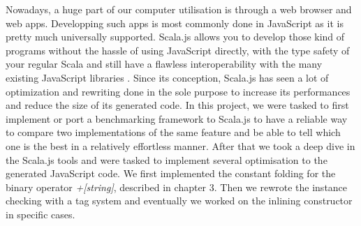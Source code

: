 Nowadays, a huge part of our computer utilisation is through a web browser and
web apps.
Developping such apps is most commonly done in JavaScript as it is pretty much
universally supported. Scala.js allows you to develop those kind of programs
without the hassle of using JavaScript directly, with the type safety of your
regular Scala and still have a flawless interoperability with the many existing
JavaScript libraries \cite{scalajsInterop}.
Since its conception, Scala.js has seen a lot of optimization and rewriting
done in the sole purpose to increase its performances and reduce the size of
its generated code.
In this project, we were tasked to first implement or port a benchmarking
framework to Scala.js to have a reliable way to compare two implementations of
the same feature and be able to tell which one is the best in a relatively
effortless manner.
After that we took a deep dive in the Scala.js tools and were tasked to
implement several optimisation to the generated JavaScript code. We first
implemented the constant folding for the binary operator \emph{+[string]},
described in chapter 3. Then we rewrote the instance checking with a tag system
and eventually we worked on the inlining constructor in specific cases.